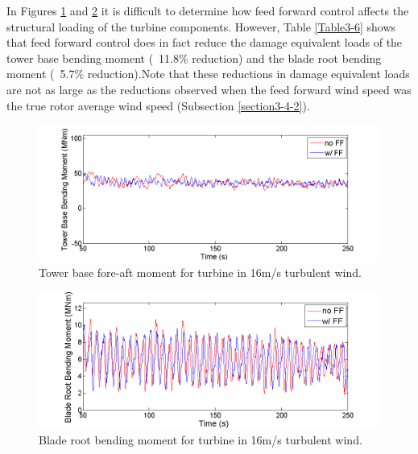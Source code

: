 In Figures \ref{fig3-34} and \ref{fig3-35} it is difficult to determine how feed forward control affects the structural loading of the turbine components. However, Table \ref{Table3-6} shows that feed forward control does in fact reduce the damage equivalent loads of the tower base bending moment (~11.8$\%$ reduction) and the blade root bending moment (~5.7$\%$ reduction).Note that these reductions in damage equivalent loads are not as large as the reductions observed when the feed forward wind speed was the true rotor average wind speed (Subsection \ref{section3-4-2}). 

\begin{figure}[htbp]
	\centering
		\includegraphics[trim = {1cm 0 2cm 0}, clip, width = \linewidth]{Figures/ch3Figures/fig3-34.png}
		
	\caption{Tower base fore-aft moment for turbine in 16m/s turbulent wind.}
	\label{fig3-34}
\end{figure}

\begin{figure}[htbp]
	\centering
		\includegraphics[trim = {1cm 0 2cm 0}, clip, width = \linewidth]{Figures/ch3Figures/fig3-35.png}
		
	\caption{Blade root bending moment for turbine in 16m/s turbulent wind.}
	\label{fig3-35}
\end{figure}


